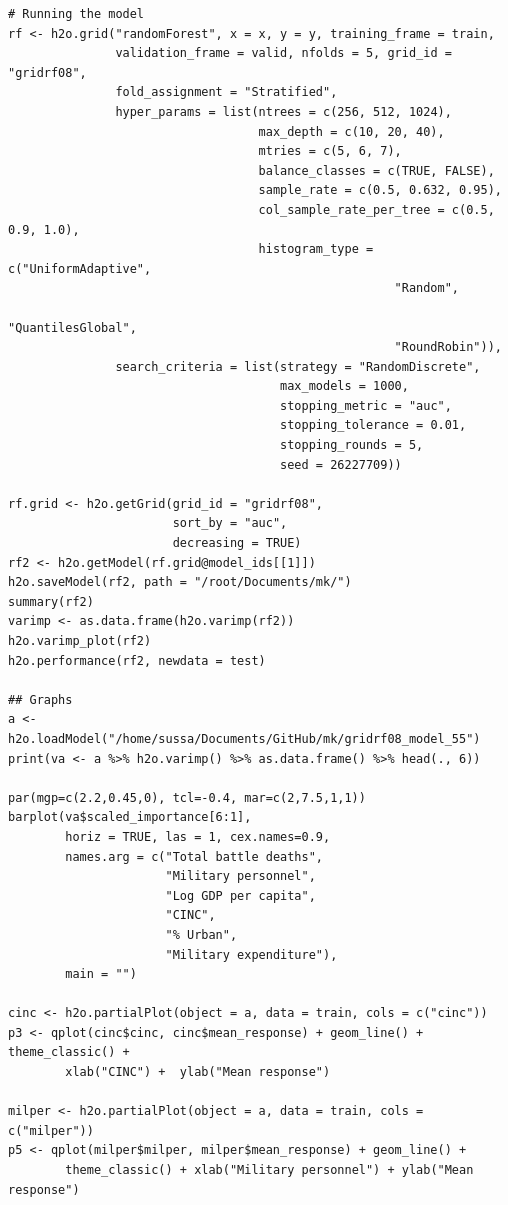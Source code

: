 \documentclass[a4paper,12pt]{article}
\begin{document}
\begin{verbatim}
# Running the model
rf <- h2o.grid("randomForest", x = x, y = y, training_frame = train, 
               validation_frame = valid, nfolds = 5, grid_id = "gridrf08",
               fold_assignment = "Stratified",
               hyper_params = list(ntrees = c(256, 512, 1024),
                                   max_depth = c(10, 20, 40),
                                   mtries = c(5, 6, 7),
                                   balance_classes = c(TRUE, FALSE),
                                   sample_rate = c(0.5, 0.632, 0.95),
                                   col_sample_rate_per_tree = c(0.5, 0.9, 1.0),
                                   histogram_type = c("UniformAdaptive",
                                                      "Random",
                                                      "QuantilesGlobal",
                                                      "RoundRobin")),
               search_criteria = list(strategy = "RandomDiscrete", 
                                      max_models = 1000, 
                                      stopping_metric = "auc", 
                                      stopping_tolerance = 0.01, 
                                      stopping_rounds = 5, 
                                      seed = 26227709)) 

rf.grid <- h2o.getGrid(grid_id = "gridrf08",
                       sort_by = "auc",
                       decreasing = TRUE)
rf2 <- h2o.getModel(rf.grid@model_ids[[1]])
h2o.saveModel(rf2, path = "/root/Documents/mk/")
summary(rf2)
varimp <- as.data.frame(h2o.varimp(rf2))
h2o.varimp_plot(rf2)
h2o.performance(rf2, newdata = test)

## Graphs
a <- h2o.loadModel("/home/sussa/Documents/GitHub/mk/gridrf08_model_55")
print(va <- a %>% h2o.varimp() %>% as.data.frame() %>% head(., 6)) 

par(mgp=c(2.2,0.45,0), tcl=-0.4, mar=c(2,7.5,1,1))
barplot(va$scaled_importance[6:1],
        horiz = TRUE, las = 1, cex.names=0.9,
        names.arg = c("Total battle deaths", 
                      "Military personnel",
                      "Log GDP per capita", 
                      "CINC",
                      "% Urban",
                      "Military expenditure"),
        main = "")

cinc <- h2o.partialPlot(object = a, data = train, cols = c("cinc"))
p3 <- qplot(cinc$cinc, cinc$mean_response) + geom_line() + theme_classic() + 
        xlab("CINC") +  ylab("Mean response")

milper <- h2o.partialPlot(object = a, data = train, cols = c("milper"))
p5 <- qplot(milper$milper, milper$mean_response) + geom_line() +
        theme_classic() + xlab("Military personnel") + ylab("Mean response")


\end{verbatim}
\end{document}
